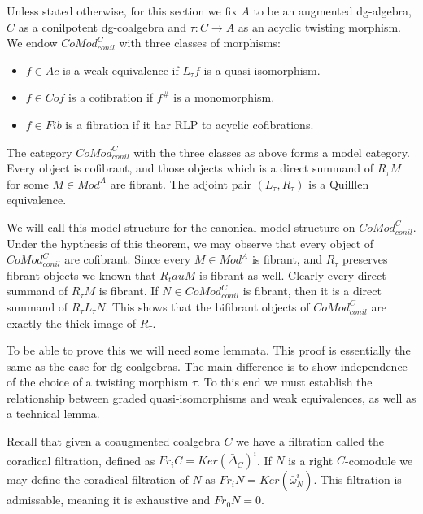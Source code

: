 \documentclass[../thesis.tex]{subfiles}
\begin{document}
            Unless stated otherwise, for this section we fix $A$ to be an augmented dg-algebra, $C$ as a conilpotent dg-coalgebra and $\tau : C \rightarrow A$ as an acyclic twisting morphism. We endow $CoMod^C_{conil}$ with three classes of morphisms:
            \begin{itemize}
                \item $f\in Ac$ is a weak equivalence if $L_\tau f$ is a quasi-isomorphism.
                \item $f\in Cof$ is a cofibration if $f^\#$ is a monomorphism.
                \item $f\in Fib$ is a fibration if it har RLP to acyclic cofibrations.
            \end{itemize}

            \begin{thm}\label{thm: model-comod}
              The category $CoMod^C_{conil}$ with the three classes as above forms a model category. Every object is cofibrant, and those objects which is a direct summand of $R_\tau M$ for some $M\in Mod^A$ are fibrant. The adjoint pair $(L_\tau, R_\tau)$ is a Quilllen equivalence.
            \end{thm}

            We will call this model structure for the canonical model structure on $CoMod^C_{conil}$. Under the hypthesis of this theorem, we may observe that every object of $CoMod^C_{conil}$ are cofibrant. Since every $M\in Mod^A$ is fibrant, and $R_\tau$ preserves fibrant objects we known that $R_tau M$ is fibrant as well. Clearly every direct summand of $R_\tau M$ is fibrant. If $N\in CoMod^C_{conil}$ is fibrant, then it is a direct summand of $R_\tau L_\tau N$. This shows that the bifibrant objects of $CoMod^C_{conil}$ are exactly the thick image of $R_\tau$.

            To be able to prove this we will need some lemmata. This proof is essentially the same as the case for dg-coalgebras. The main difference is to show independence of the choice of a twisting morphism $\tau$. To this end we must establish the relationship between graded quasi-isomorphisms and weak equivalences, as well as a technical lemma.

            Recall that given a coaugmented coalgebra $C$ we have a filtration called the coradical filtration, defined as $Fr_iC = Ker(\bar{\Delta}_C)^i$. If $N$ is a right $C$-comodule we may define the coradical filtration of $N$ as $Fr_iN = Ker(\bar{\omega}_N^i)$. This filtration is admissable, meaning it is exhaustive and $Fr_0N=0$.
\end{document}

